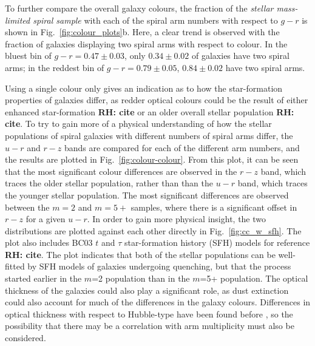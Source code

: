 \documentclass[useAMS,usenatbib]{mn2e}
\newcommand{\rh}[1]{{\bf \textcolor{RoyalPurple}{RH: #1}}}
\begin{document}
To further compare the overall galaxy colours, the fraction of the \textit{stellar mass-limited spiral sample} with each of the spiral arm numbers with respect to $g-r$ is shown in Fig.~\ref{fig:colour_plots}b. Here, a clear trend is observed with the fraction of galaxies displaying two spiral arms with respect to colour. In the bluest bin of $g-r=0.47 \pm 0.03$, only $0.34 \pm 0.02$ of galaxies have two spiral arms; in the reddest bin of $g-r=0.79 \pm 0.05$, $0.84 \pm 0.02$ have two spiral arms.

Using a single colour only gives an indication as to how the star-formation properties of galaxies differ, as redder optical colours could be the result of either enhanced star-formation \rh{cite} or an older overall stellar population \rh{cite}. To try to gain more of a physical understanding of how the stellar populations of spiral galaxies with different numbers of spiral arms differ, the $u-r$ and $r-z$ bands are compared for each of the different arm numbers, and the results are plotted in Fig.~\ref{fig:colour-colour}. From this plot, it can be seen that the most significant colour differences are observed in the $r-z$ band, which traces the older stellar population, rather than than the $u-r$ band, which traces the younger stellar population. The most significant differences are observed between the $m=2$ and $m=5+$ samples, where there is a significant offset in $r-z$ for a given $u-r$. In order to gain more physical insight, the two distributions are plotted against each other directly in Fig.~\ref{fig:cc_w_sfh}. The plot also includes BC03 $t$ and $\tau$ star-formation history (SFH) models for reference \rh{cite}. The plot indicates that both of the stellar populations can be well-fitted by SFH models of galaxies undergoing quenching, but that the process started earlier in the $m$=2 population than in the $m$=5+ population. The optical thickness of the galaxies could also play a significant role, as dust extinction could also account for much of the differences in the galaxy colours. Differences in optical thickness with respect to Hubble-type have been found before \citep{Ma_02}, so the possibility that there may be a correlation with arm multiplicity must also be considered.
\end{document}
